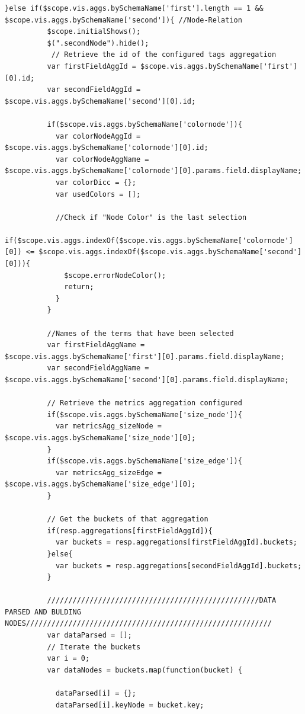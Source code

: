 \documentclass[a4paper, 12pt]{book}
\begin{document}
\begin{lstlisting}[frame=single]
        }else if($scope.vis.aggs.bySchemaName['first'].length == 1 && $scope.vis.aggs.bySchemaName['second']){ //Node-Relation
          $scope.initialShows();
          $(".secondNode").hide();
           // Retrieve the id of the configured tags aggregation
          var firstFieldAggId = $scope.vis.aggs.bySchemaName['first'][0].id;
          var secondFieldAggId = $scope.vis.aggs.bySchemaName['second'][0].id;

          if($scope.vis.aggs.bySchemaName['colornode']){
            var colorNodeAggId = $scope.vis.aggs.bySchemaName['colornode'][0].id;
            var colorNodeAggName = $scope.vis.aggs.bySchemaName['colornode'][0].params.field.displayName;
            var colorDicc = {};
            var usedColors = [];

            //Check if "Node Color" is the last selection
            if($scope.vis.aggs.indexOf($scope.vis.aggs.bySchemaName['colornode'][0]) <= $scope.vis.aggs.indexOf($scope.vis.aggs.bySchemaName['second'][0])){
              $scope.errorNodeColor();
              return;
            }
          }

          //Names of the terms that have been selected
          var firstFieldAggName = $scope.vis.aggs.bySchemaName['first'][0].params.field.displayName;
          var secondFieldAggName = $scope.vis.aggs.bySchemaName['second'][0].params.field.displayName;

          // Retrieve the metrics aggregation configured
          if($scope.vis.aggs.bySchemaName['size_node']){
            var metricsAgg_sizeNode = $scope.vis.aggs.bySchemaName['size_node'][0];
          }
          if($scope.vis.aggs.bySchemaName['size_edge']){
            var metricsAgg_sizeEdge = $scope.vis.aggs.bySchemaName['size_edge'][0];
          }

          // Get the buckets of that aggregation
          if(resp.aggregations[firstFieldAggId]){
            var buckets = resp.aggregations[firstFieldAggId].buckets;
          }else{
            var buckets = resp.aggregations[secondFieldAggId].buckets;
          }

          //////////////////////////////////////////////////DATA PARSED AND BULDING NODES//////////////////////////////////////////////////////////
          var dataParsed = [];
          // Iterate the buckets
          var i = 0;
          var dataNodes = buckets.map(function(bucket) {

            dataParsed[i] = {};
            dataParsed[i].keyNode = bucket.key;


\end{lstlisting}
\end{document}
